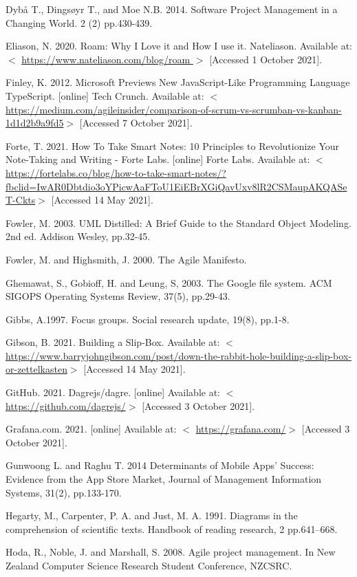 \documentclass{article}
\begin{document}
{Dybå T., Dingsøyr T., and Moe N.B. 2014. Software Project Management in a Changing World. 2 (2) pp.430-439.

Eliason, N. 2020. Roam: Why I Love it and How I use it. Nateliason. Available at: $<$ \url{https://www.nateliason.com/blog/roam }$>$ [Accessed 1 October 2021].

Finley, K. 2012. Microsoft Previews New JavaScript-Like Programming Language TypeScript. [online] Tech Crunch. Available at: $<$ \url{https://medium.com/agileinsider/comparison-of-scrum-vs-scrumban-vs-kanban-1d1d2b9a9fd5}$>$ [Accessed 7 October 2021].

Forte, T. 2021. How To Take Smart Notes: 10 Principles to Revolutionize Your Note-Taking and Writing - Forte Labs. [online] Forte Labs. Available at: $<$ \url{https://fortelabs.co/blog/how-to-take-smart-notes/?fbclid=IwAR0Dbtdio3oYPicwAaFToU1EiEBrXGiQavUxv8lR2CSMaupAKQASeT-Ckts}$>$ [Accessed 14 May 2021].

Fowler, M. 2003. UML Distilled: A Brief Guide to the Standard Object Modeling. 2nd ed. Addison Wesley, pp.32-45.

Fowler, M. and Highsmith, J. 2000. The Agile Manifesto.

Ghemawat, S., Gobioff, H. and Leung, S, 2003. The Google file system. ACM SIGOPS Operating Systems Review, 37(5), pp.29-43.

Gibbs, A.1997. Focus groups. Social research update, 19(8), pp.1-8.

Gibson, B. 2021. Building a Slip-Box. Available at: $<$ \url{https://www.barryjohngibson.com/post/down-the-rabbit-hole-building-a-slip-box-or-zettelkasten}$>$ [Accessed 14 May 2021].

GitHub. 2021. Dagrejs/dagre. [online] Available at: $<$ \url{https://github.com/dagrejs/}$>$ [Accessed 3 October 2021].

Grafana.com. 2021. [online] Available at: $<$ \url{https://grafana.com/}$>$ [Accessed 3 October 2021].

Gunwoong L. and Raghu T. 2014 Determinants of Mobile Apps' Success: Evidence from the App Store Market, Journal of Management Information Systems, 31(2), pp.133-170.

Hegarty, M., Carpenter, P. A. and Just, M. A. 1991. Diagrams in the comprehension of scientific texts. Handbook of reading research, 2 pp.641–668.

Hoda, R., Noble, J. and Marshall, S. 2008. Agile project management. In New Zealand Computer Science Research Student Conference, NZCSRC.

}
\end{document}
